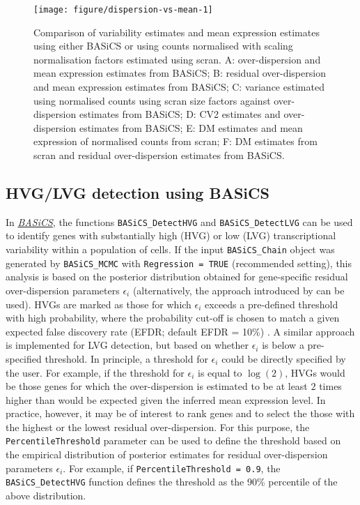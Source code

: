 \documentclass[9pt,a4paper,]{extarticle}
\begin{document}
\begin{figure}

{\centering \texttt{[image: figure/dispersion-vs-mean-1]} 

}

\caption{Comparison of variability estimates and mean expression estimates using either BASiCS or using counts normalised with scaling normalisation factors estimated using scran. A: over-dispersion and mean expression estimates from BASiCS; B: residual over-dispersion and mean expression estimates from BASiCS; C: variance estimated using normalised counts using scran size factors against over-dispersion estimates from BASiCS; D: CV2 estimates and over-dispersion estimates from BASiCS; E: DM estimates and mean expression of normalised counts from scran; F: DM estimates from scran and residual over-dispersion estimates from BASiCS.}\label{fig:dispersion-vs-mean}
\end{figure}

\hypertarget{hvglvg-detection-using-basics}{%
\subsection{HVG/LVG detection using BASiCS}\label{hvglvg-detection-using-basics}}

In \emph{\href{https://bioconductor.org/packages/3.11/BASiCS}{BASiCS}}, the functions \texttt{BASiCS\_DetectHVG} and
\texttt{BASiCS\_DetectLVG} can be used to identify genes with substantially high (HVG)
or low (LVG) transcriptional variability within a population of cells.
If the input \texttt{BASiCS\_Chain} object was generated by \texttt{BASiCS\_MCMC} with
\texttt{Regression\ =\ TRUE} (recommended setting), this analysis is based on the
posterior distribution obtained for gene-specific residual over-dispersion
parameters \(\epsilon_i\) (alternatively, the approach introduced by
\citep{Vallejos2015} can be used).
HVGs are marked as those for which \(\epsilon_i\) exceeds a pre-defined threshold
with high probability, where the probability cut-off is chosen to match a given
expected false discovery rate (EFDR; default EFDR = 10\%) \citep{Newton2004}.
A similar approach is implemented for LVG detection, but based on whether
\(\epsilon_i\) is below a pre-specified threshold.
In principle, a threshold for \(\epsilon_i\) could be directly specified by the
user.
For example, if the threshold for \(\epsilon_i\) is equal to \(\log(2)\), HVGs would
be those genes for which the over-dispersion is estimated to be at least \(2\)
times higher than would be expected given the inferred mean expression level.
In practice, however, it may be of interest to rank genes and to select the
those with the highest or the lowest residual over-dispersion.
For this purpose, the \texttt{PercentileThreshold} parameter can be used to define the
threshold based on the empirical distribution of posterior estimates for
residual over-dispersion parameters \(\epsilon_i\).
For example, if \texttt{PercentileThreshold\ =\ 0.9}, the \texttt{BASiCS\_DetectHVG} function
defines the threshold as the 90\% percentile of the above distribution.
\end{document}
